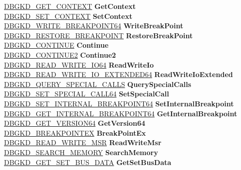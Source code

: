 \begin{DoxyCompactItemize}
\begin{tabbing}
\>\hyperlink{struct___d_b_g_k_d___g_e_t___c_o_n_t_e_x_t}{DBGKD\_GET\_CONTEXT} {\bfseries GetContext}\\
\>\hyperlink{struct___d_b_g_k_d___s_e_t___c_o_n_t_e_x_t}{DBGKD\_SET\_CONTEXT} {\bfseries SetContext}\\
\>\hyperlink{struct___d_b_g_k_d___w_r_i_t_e___b_r_e_a_k_p_o_i_n_t64}{DBGKD\_WRITE\_BREAKPOINT64} {\bfseries WriteBreakPoint}\\
\>\hyperlink{struct___d_b_g_k_d___r_e_s_t_o_r_e___b_r_e_a_k_p_o_i_n_t}{DBGKD\_RESTORE\_BREAKPOINT} {\bfseries RestoreBreakPoint}\\
\>\hyperlink{struct___d_b_g_k_d___c_o_n_t_i_n_u_e}{DBGKD\_CONTINUE} {\bfseries Continue}\\
\>\hyperlink{struct___d_b_g_k_d___c_o_n_t_i_n_u_e2}{DBGKD\_CONTINUE2} {\bfseries Continue2}\\
\>\hyperlink{struct___d_b_g_k_d___r_e_a_d___w_r_i_t_e___i_o64}{DBGKD\_READ\_WRITE\_IO64} {\bfseries ReadWriteIo}\\
\>\hyperlink{struct___d_b_g_k_d___r_e_a_d___w_r_i_t_e___i_o___e_x_t_e_n_d_e_d64}{DBGKD\_READ\_WRITE\_IO\_EXTENDED64} {\bfseries ReadWriteIoExtended}\\
\>\hyperlink{struct___d_b_g_k_d___q_u_e_r_y___s_p_e_c_i_a_l___c_a_l_l_s}{DBGKD\_QUERY\_SPECIAL\_CALLS} {\bfseries QuerySpecialCalls}\\
\>\hyperlink{struct___d_b_g_k_d___s_e_t___s_p_e_c_i_a_l___c_a_l_l64}{DBGKD\_SET\_SPECIAL\_CALL64} {\bfseries SetSpecialCall}\\
\>\hyperlink{struct___d_b_g_k_d___s_e_t___i_n_t_e_r_n_a_l___b_r_e_a_k_p_o_i_n_t64}{DBGKD\_SET\_INTERNAL\_BREAKPOINT64} {\bfseries SetInternalBreakpoint}\\
\>\hyperlink{struct___d_b_g_k_d___g_e_t___i_n_t_e_r_n_a_l___b_r_e_a_k_p_o_i_n_t64}{DBGKD\_GET\_INTERNAL\_BREAKPOINT64} {\bfseries GetInternalBreakpoint}\\
\>\hyperlink{struct___d_b_g_k_d___g_e_t___v_e_r_s_i_o_n64}{DBGKD\_GET\_VERSION64} {\bfseries GetVersion64}\\
\>\hyperlink{struct___d_b_g_k_d___b_r_e_a_k_p_o_i_n_t_e_x}{DBGKD\_BREAKPOINTEX} {\bfseries BreakPointEx}\\
\>\hyperlink{struct___d_b_g_k_d___r_e_a_d___w_r_i_t_e___m_s_r}{DBGKD\_READ\_WRITE\_MSR} {\bfseries ReadWriteMsr}\\
\>\hyperlink{struct___d_b_g_k_d___s_e_a_r_c_h___m_e_m_o_r_y}{DBGKD\_SEARCH\_MEMORY} {\bfseries SearchMemory}\\
\>\hyperlink{struct___d_b_g_k_d___g_e_t___s_e_t___b_u_s___d_a_t_a}{DBGKD\_GET\_SET\_BUS\_DATA} {\bfseries GetSetBusData}\\

\end{tabbing}
\end{DoxyCompactItemize}
